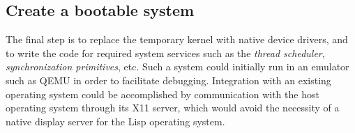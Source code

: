 \subsection{Create a bootable system}

The final step is to replace the temporary \unix{} kernel with native
device drivers, and to write the code for required system services
such as the \emph{thread scheduler}, \emph{synchronization
  primitives}, etc.  Such a system could initially run in an emulator
such as QEMU in order to facilitate debugging.  Integration with an
existing operating system could be accomplished by communication with
the host operating system through its X11 server, which would avoid
the necessity of a native display server for the Lisp operating
system. 
